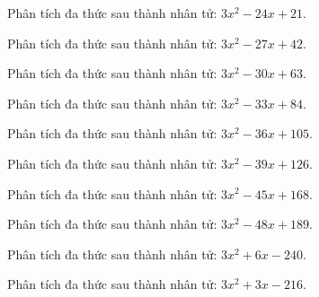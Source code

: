 \begin{bt}
	Phân tích đa thức sau thành nhân tử: $3 x^2 - 24 x + 21$.
\end{bt}
\begin{bt}
	Phân tích đa thức sau thành nhân tử: $3 x^2 - 27 x + 42$.
\end{bt}
\begin{bt}
	Phân tích đa thức sau thành nhân tử: $3 x^2 - 30 x + 63$.
\end{bt}
\begin{bt}
	Phân tích đa thức sau thành nhân tử: $3 x^2 - 33 x + 84$.
\end{bt}
\begin{bt}
	Phân tích đa thức sau thành nhân tử: $3 x^2 - 36 x + 105$.
\end{bt}
\begin{bt}
	Phân tích đa thức sau thành nhân tử: $3 x^2 - 39 x + 126$.
\end{bt}
\begin{bt}
	Phân tích đa thức sau thành nhân tử: $3 x^2 - 45 x + 168$.
\end{bt}
\begin{bt}
	Phân tích đa thức sau thành nhân tử: $3 x^2 - 48 x + 189$.
\end{bt}
\begin{bt}
	Phân tích đa thức sau thành nhân tử: $3 x^2 + 6 x - 240$.
\end{bt}
\begin{bt}
	Phân tích đa thức sau thành nhân tử: $3 x^2 + 3 x - 216$.
\end{bt}
